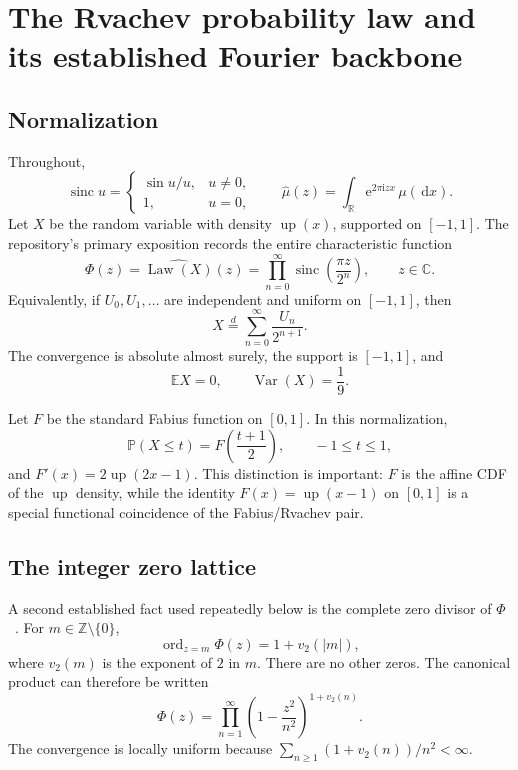 \documentclass[11pt,oneside]{article}
\theoremstyle{definition}
\theoremstyle{remark}
\newcommand{\R}{\mathbb R}
\newcommand{\C}{\mathbb C}
\newcommand{\Z}{\mathbb Z}
\newcommand{\Up}{\operatorname{up}}
\newcommand{\sinc}{\operatorname{sinc}}
\newcommand{\e}{\mathrm e}
\newcommand{\ii}{\mathrm i}
\newcommand{\dd}{\,\mathrm d}
\newcommand{\Var}{\operatorname{Var}}
\newcommand{\vtwo}{v_2}
\numberwithin{equation}{section}
\newcommand{\ord}{\operatorname{ord}}
\newcommand{\Law}{\operatorname{Law}}
\newcommand{\1}{\mathbf 1}
\begin{document}
\section{The Rvachev probability law and its established Fourier backbone}
\label{sec:backbone}

\subsection{Normalization}

Throughout,
\[
 \sinc u=\begin{cases}\sin u/u,&u\ne0,\\1,&u=0,\end{cases}
 \qquad
 \widehat\mu(z)=\int_{\R}\e^{2\pi\ii zx}\,\mu(\dd x).
\]
Let $X$ be the random variable with density $\Up(x)$, supported on $[-1,1]$.
The repository's primary exposition records the entire characteristic function~\cite{ProveItPrimary}
\begin{equation}
 \Phi(z)=\widehat{\Law(X)}(z)
 =\prod_{n=0}^{\infty}\sinc\!\left(\frac{\pi z}{2^n}\right),
 \qquad z\in\C.
 \label{eq:Phi}
\end{equation}
Equivalently, if $U_0,U_1,\ldots$ are independent and uniform on $[-1,1]$, then
\begin{equation}
 X\overset d=\sum_{n=0}^{\infty}\frac{U_n}{2^{n+1}}.
 \label{eq:X-random-series}
\end{equation}
The convergence is absolute almost surely, the support is $[-1,1]$, and
\begin{equation}
 \mathbb E X=0,
 \qquad
 \Var(X)=\frac19.
 \label{eq:X-variance}
\end{equation}

Let $F$ be the standard Fabius function on $[0,1]$.  In this normalization,
\begin{equation}
 \mathbb P(X\le t)=F\!\left(\frac{t+1}{2}\right),
 \qquad -1\le t\le1,
 \label{eq:F-cdf}
\end{equation}
and $F'(x)=2\Up(2x-1)$.  This distinction is important: $F$ is the affine CDF of
the $\Up$ density, while the identity $F(x)=\Up(x-1)$ on $[0,1]$ is a special
functional coincidence of the Fabius/Rvachev pair.

\subsection{The integer zero lattice}

A second established fact used repeatedly below is the complete zero divisor of $\Phi$~\cite{ProveItPrimary}.
For $m\in\Z\setminus\{0\}$,
\begin{equation}
 \ord_{z=m}\Phi(z)=1+\vtwo(|m|),
 \label{eq:Phi-zero-order}
\end{equation}
where $\vtwo(m)$ is the exponent of $2$ in $m$.  There are no other zeros.  The
canonical product can therefore be written
\begin{equation}
 \Phi(z)=\prod_{n=1}^{\infty}
 \left(1-\frac{z^2}{n^2}\right)^{1+\vtwo(n)}.
 \label{eq:Phi-canonical}
\end{equation}
The convergence is locally uniform because
$\sum_{n\ge1}(1+\vtwo(n))/n^2<\infty$.
\end{document}
